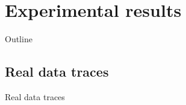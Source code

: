 \documentclass[mathserif]{beamer}
\begin{document}
	
\section{Experimental results}

	
	\begin{frame}{Outline}
		\tableofcontents[currentsection]
	\end{frame}

	\subsection{Real data traces}
	
	\begin{frame}{Real data traces}
	\begin{center}
		\begin{tikzpicture}[->,>=stealth',shorten >=1pt,auto]


\end{tikzpicture}
\end{center}
\end{frame}
\end{document}
